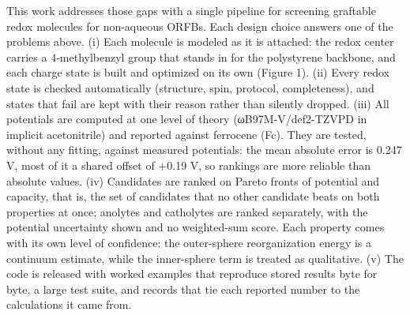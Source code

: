 \documentclass[journal=jcisd8,manuscript=article]{achemso}
\begin{document}
This work addresses those gaps with a single pipeline for screening graftable redox molecules for non-aqueous ORFBs. Each design choice answers one of the problems above. (i) Each molecule is modeled as it is attached: the redox center carries a 4-methylbenzyl group that stands in for the polystyrene backbone, and each charge state is built and optimized on its own (Figure 1). (ii) Every redox state is checked automatically (structure, spin, protocol, completeness), and states that fail are kept with their reason rather than silently dropped. (iii) All potentials are computed at one level of theory (ωB97M-V/def2-TZVPD in implicit acetonitrile) and reported against ferrocene (Fc). They are tested, without any fitting, against measured potentials: the mean absolute error is 0.247 V, most of it a shared offset of +0.19 V, so rankings are more reliable than absolute values. (iv) Candidates are ranked on Pareto fronts of potential and capacity, that is, the set of candidates that no other candidate beats on both properties at once; anolytes and catholytes are ranked separately, with the potential uncertainty shown and no weighted-sum score. Each property comes with its own level of confidence: the outer-sphere reorganization energy is a continuum estimate, while the inner-sphere term is treated as qualitative. (v) The code is released with worked examples that reproduce stored results byte for byte, a large test suite, and records that tie each reported number to the calculations it came from.
\end{document}
